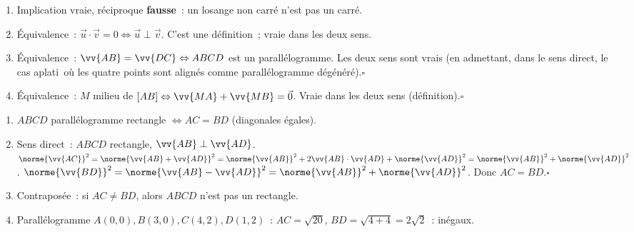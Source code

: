 
\begin{enumerate}
  \item Implication vraie, r\'eciproque \textbf{fausse}~:
        un losange non carr\'e n'est pas un carr\'e.
  \item \'Equivalence~: $\vec{u}\cdot\vec{v}=0\Leftrightarrow\vec{u}\perp\vec{v}$.
        C'est une d\'efinition~; vraie dans les deux sens.
  \item \'Equivalence~: $\vv{AB}=\vv{DC}\Leftrightarrow ABCD$ est un parall\'elogramme.
        Les deux sens sont vrais (en admettant, dans le sens direct, le cas \og aplati\fg\ o\`u les quatre points sont align\'es comme parall\'elogramme d\'eg\'en\'er\'e).\hfill$\square$
  \item \'Equivalence~: $M$ milieu de $[AB]\Leftrightarrow\vv{MA}+\vv{MB}=\vec{0}$.
        Vraie dans les deux sens (d\'efinition).\hfill$\square$
\end{enumerate}


\begin{enumerate}
  \item $ABCD$ parall\'elogramme rectangle
        $\Leftrightarrow AC=BD$ (diagonales \'egales).
  \item Sens direct~: $ABCD$ rectangle, $\vv{AB}\perp\vv{AD}$.
        $\norme{\vv{AC}}^2=\norme{\vv{AB}+\vv{AD}}^2=\norme{\vv{AB}}^2+2\vv{AB}\cdot\vv{AD}+\norme{\vv{AD}}^2=\norme{\vv{AB}}^2+\norme{\vv{AD}}^2$.
        $\norme{\vv{BD}}^2=\norme{\vv{AB}-\vv{AD}}^2=\norme{\vv{AB}}^2+\norme{\vv{AD}}^2$.
        Donc $AC=BD$.\hfill$\square$
  \item Contrapos\'ee~: si $AC\ne BD$, alors $ABCD$ n'est pas un rectangle.
  \item Parall\'elogramme $A(0,0),B(3,0),C(4,2),D(1,2)$~:
        $AC=\sqrt{20}$, $BD=\sqrt{4+4}=2\sqrt{2}$~: in\'egaux.\checkmark
\end{enumerate}


